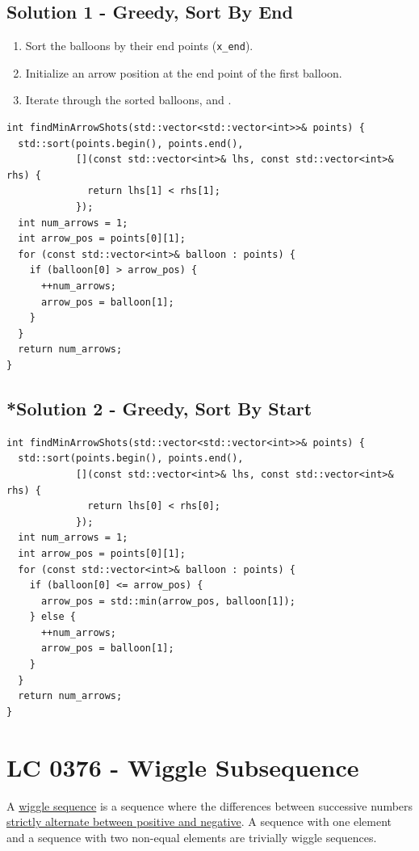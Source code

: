 \subsection*{Solution 1 - Greedy, Sort By End}
\begin{enumerate}
\item Sort the balloons by their end points ({\colorbox{CodeBackground}{\lstinline|x_end|}}).
\item Initialize an arrow position at the end point of the first balloon.
\item Iterate through the sorted balloons, and {\color{magenta}{whenever the current balloon starts after the arrow position, increase the number of arrows and set the arrow position to the end point of the current balloon}}.
\end{enumerate}
\begin{lstlisting}
int findMinArrowShots(std::vector<std::vector<int>>& points) {
  std::sort(points.begin(), points.end(),
            [](const std::vector<int>& lhs, const std::vector<int>& rhs) {
              return lhs[1] < rhs[1];
            });
  int num_arrows = 1;
  int arrow_pos = points[0][1];
  for (const std::vector<int>& balloon : points) {
    if (balloon[0] > arrow_pos) {
      ++num_arrows;
      arrow_pos = balloon[1];
    }
  }
  return num_arrows;
}
\end{lstlisting}

\subsection*{*Solution 2 - Greedy, Sort By Start}
\begin{lstlisting}
int findMinArrowShots(std::vector<std::vector<int>>& points) {
  std::sort(points.begin(), points.end(),
            [](const std::vector<int>& lhs, const std::vector<int>& rhs) {
              return lhs[0] < rhs[0];
            });
  int num_arrows = 1;
  int arrow_pos = points[0][1];
  for (const std::vector<int>& balloon : points) {
    if (balloon[0] <= arrow_pos) {
      arrow_pos = std::min(arrow_pos, balloon[1]);
    } else {
      ++num_arrows;
      arrow_pos = balloon[1];
    }
  }
  return num_arrows;
}
\end{lstlisting}

\section{LC 0376 - Wiggle Subsequence}
A \ul{wiggle sequence} is a sequence where the differences between successive numbers \ul{strictly alternate between positive and negative}. A sequence with one element and a sequence with two non-equal elements are trivially wiggle sequences.\\

